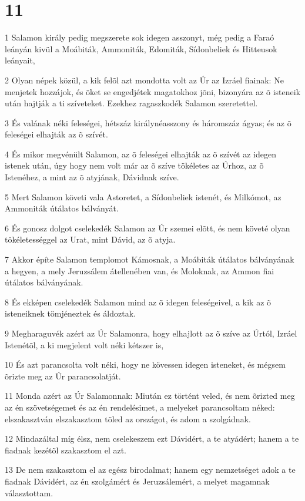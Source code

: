 \chapter{11}

\par 1 Salamon király pedig megszerete sok idegen asszonyt, még pedig a Faraó leányán kivül a Moábiták, Ammoniták, Edomiták, Sídonbeliek és Hitteusok leányait,
\par 2 Olyan népek közül, a kik felõl azt mondotta volt az Úr az Izráel fiainak: Ne menjetek hozzájok, és õket se engedjétek magatokhoz jõni, bizonyára az õ isteneik után hajtják a ti szíveteket. Ezekhez ragaszkodék Salamon szeretettel.
\par 3 És valának néki feleségei, hétszáz királynéasszony és háromszáz ágyas; és az õ feleségei elhajták az õ szívét.
\par 4 És mikor megvénült Salamon, az õ feleségei elhajták az õ szívét az idegen istenek után, úgy hogy nem volt már az õ szíve tökéletes az Úrhoz, az õ Istenéhez, a mint az õ atyjának, Dávidnak szíve.
\par 5 Mert Salamon követi vala Astoretet, a Sídonbeliek istenét, és Milkómot, az Ammoniták útálatos bálványát.
\par 6 És gonosz dolgot cselekedék Salamon az Úr szemei elõtt, és nem követé olyan tökéletességgel az Urat, mint Dávid, az õ atyja.
\par 7 Akkor építe Salamon templomot Kámosnak, a Moábiták útálatos bálványának a hegyen, a mely Jeruzsálem átellenében van, és  Moloknak, az Ammon fiai útálatos bálványának.
\par 8 És ekképen cselekedék Salamon mind az õ idegen feleségeivel, a kik az õ isteneiknek tömjéneztek és áldoztak.
\par 9 Megharaguvék azért az Úr Salamonra, hogy elhajlott az õ szíve az Úrtól, Izráel Istenétõl, a ki megjelent volt néki kétszer is,
\par 10 És azt parancsolta volt néki, hogy ne kövessen idegen isteneket, és mégsem õrizte meg az Úr parancsolatját.
\par 11 Monda azért az Úr Salamonnak: Miután ez történt veled, és nem õrizted meg az én szövetségemet és az én rendelésimet, a melyeket parancsoltam néked: elszakasztván elszakasztom tõled az országot, és adom a  szolgádnak.
\par 12 Mindazáltal míg élsz, nem cselekeszem ezt Dávidért, a te atyádért; hanem a te fiadnak kezétõl szakasztom el azt.
\par 13 De nem szakasztom el az egész birodalmat; hanem egy nemzetséget adok a te fiadnak Dávidért, az én szolgámért és Jeruzsálemért, a melyet magamnak választottam.
